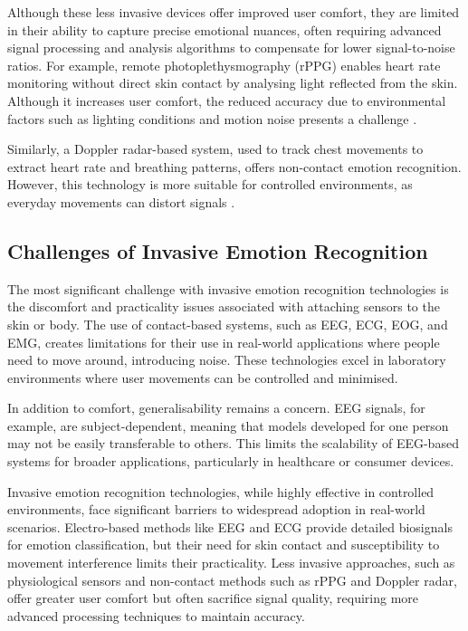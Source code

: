 Although these less invasive devices offer improved user comfort, they are limited in their ability to capture precise emotional nuances, often requiring advanced signal processing and analysis algorithms to compensate for lower signal-to-noise ratios. For example, remote photoplethysmography (rPPG) enables heart rate monitoring without direct skin contact by analysing light reflected from the skin. Although it increases user comfort, the reduced accuracy due to environmental factors such as lighting conditions and motion noise presents a challenge \cite{Dzedzickis2020-hf}.

Similarly, a Doppler radar-based system, used to track chest movements to extract heart rate and breathing patterns, offers non-contact emotion recognition. However, this technology is more suitable for controlled environments, as everyday movements can distort signals \cite{Lubecke-4751478}.

\subsection{Challenges of Invasive Emotion Recognition}
The most significant challenge with invasive emotion recognition technologies is the discomfort and practicality issues associated with attaching sensors to the skin or body. The use of contact-based systems, such as EEG, ECG, EOG, and EMG, creates limitations for their use in real-world applications where people need to move around, introducing noise. These technologies excel in laboratory environments where user movements can be controlled and minimised. 

In addition to comfort, generalisability remains a concern. EEG signals, for example, are subject-dependent, meaning that models developed for one person may not be easily transferable to others. This limits the scalability of EEG-based systems for broader applications, particularly in healthcare or consumer devices.

Invasive emotion recognition technologies, while highly effective in controlled environments, face significant barriers to widespread adoption in real-world scenarios. Electro-based methods like EEG and ECG provide detailed biosignals for emotion classification, but their need for skin contact and susceptibility to movement interference limits their practicality. Less invasive approaches, such as physiological sensors and non-contact methods such as rPPG and Doppler radar, offer greater user comfort but often sacrifice signal quality, requiring more advanced processing techniques to maintain accuracy.

